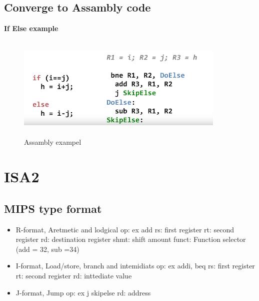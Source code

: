 \subsection{Converge to Assambly code}
\noindent\textbf{If Else example} \newline
\begin{figure}[h]
    \vspace{10mm}
    \centering
    \includegraphics[width=10cm, height=5cm]{image/assambly-exampel.png} 
    \caption{Assambly exampel}
\end{figure}

\section{ISA2}
\subsection{MIPS type format}
\begin{itemize}
\item  R-format, Aretmetic and lodgical \newline
  op: ex add \newline
  rs: first register \newline
  rt: second register \newline
  rd: destination register \newline
  shmt: shift amount \newline
  funct: Function selector (add = 32, sub =34)
\item  I-format, Load/store, branch and intemidiats \newline 
  op: ex addi, beq \newline
  rs: first register \newline
  rt: second register \newline
  rd: inttediate value 
\item  J-format, Jump 
  op: ex j skipelse \newline
  rd: address   
\end{itemize}

